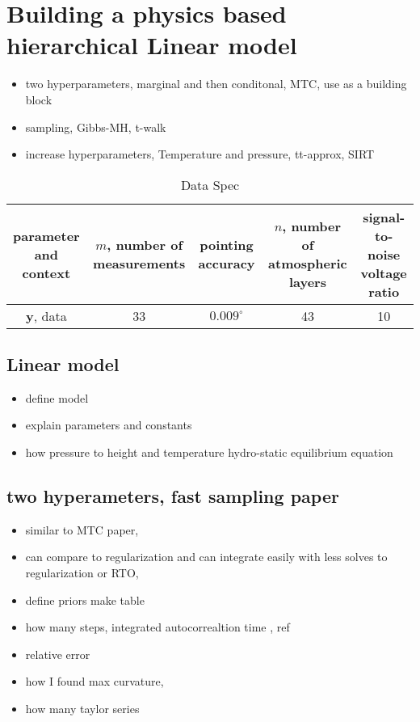 
\chapter{Building a physics based hierarchical Linear model}
\begin{itemize}
	\item two hyperparameters, marginal and then conditonal, MTC, use as a building block \cite{fox2016fast, rue2005gaussian}
	\item  sampling, Gibbs-MH, t-walk \cite{christen2010general}
	\item increase hyperparameters, Temperature and pressure, tt-approx, SIRT \cite{cui2022deep, atmosphere1976us}
\end{itemize}

\begin{table}
	\centering
	\begin{tabular}{ |c||c|c|c|c|  }
		\hline
		\makecell{parameter\\ and context}& \makecell{$m$, number of\\ measurements}& \makecell{pointing\\ accuracy }& \makecell{$n$, number of \\atmospheric layers}& \makecell{signal-to-noise\\ voltage ratio}\\
		\hline
		$\bm{y}$, data& 33&  $0.009^{\circ}$ &43& 10\\
		\hline
	\end{tabular}
	\caption{Data Spec}
	\label{tab:}
\end{table}


\section{Linear model}
\begin{itemize}
	\item define model \cite{readings2000envisat}
	\item explain parameters and constants \cite{gordon2022hitran2020}
	\item how pressure to height and temperature hydro-static equilibrium equation \cite{atmosphere1976us}
\end{itemize}

\section{two hyperameters, fast sampling paper}
\begin{itemize}
	\item similar to MTC paper,  \cite{fox2016fast}
	\item can compare to regularization and can integrate easily with less solves to regularization or RTO, \cite{hansen1993use}
	\item define priors make table
	\item how many steps, integrated autocorrealtion time , ref
	\item relative error
	\item how I found max curvature, \cite{satopaa2011kneedle}
	\item how many taylor series
\end{itemize}

